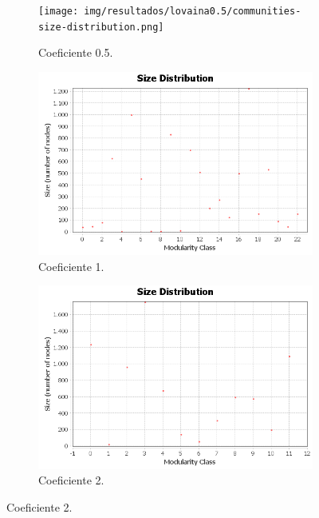 \begin{figure}
  \centering  
  \begin{subfigure}[t]{0.48\textwidth}
    \centering
    \texttt{[image: img/resultados/lovaina0.5/communities-size-distribution.png]}
    \caption{Coeficiente 0.5.}
  \end{subfigure}
  \vspace{7mm}
  \hfill
  \begin{subfigure}[t]{0.48\textwidth}
    \centering
    \includegraphics[width=\textwidth]{img/resultados/lovaina1/communities-size-distribution.png}
    \caption{Coeficiente 1.}
  \end{subfigure}
  \hfill
  \begin{subfigure}[t]{0.48\textwidth}
    \centering
    \includegraphics[width=\textwidth]{img/resultados/lovaina2/communities-size-distribution.png}
    \caption{Coeficiente 2.}
  \end{subfigure}

\end{figure}
